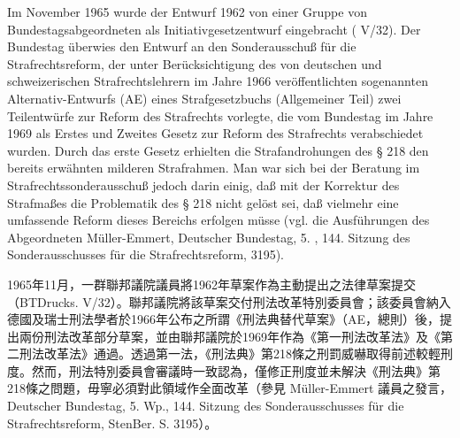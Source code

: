 \documentclass[12pt]{article}
\begin{document}
\syncleft
\begin{sourcepara}
Im November 1965 wurde der Entwurf 1962 von einer Gruppe von Bundestagsabgeordneten als Initiativgesetzentwurf eingebracht (\abbrBTDrucks{} V/32). Der Bundestag überwies den Entwurf an den Sonderausschuß für die Strafrechtsreform, der unter Berücksichtigung des von deutschen und schweizerischen Strafrechtslehrern im Jahre 1966 veröffentlichten sogenannten Alternativ-Entwurfs (AE) eines Strafgesetzbuchs (Allgemeiner Teil) zwei Teilentwürfe zur Reform des Strafrechts vorlegte, die vom Bundestag im Jahre 1969 als Erstes und Zweites Gesetz zur Reform des Strafrechts verabschiedet wurden. Durch das erste Gesetz erhielten die Strafandrohungen des § 218 \abbrStGB{} den bereits erwähnten milderen Strafrahmen. Man war sich bei der Beratung im Strafrechtssonderausschuß jedoch darin einig, daß mit der Korrektur des Strafmaßes die Problematik des § 218 \abbrStGB{} nicht gelöst sei, daß vielmehr eine umfassende Reform dieses Bereichs erfolgen müsse (vgl. die Ausführungen des Abgeordneten \abbrDr{} Müller-Emmert, Deutscher Bundestag, 5. \abbrWp{}, 144. Sitzung des Sonderausschusses für die Strafrechtsreform, \abbrStenBer{} \abbrS{} 3195).
\end{sourcepara}
\begin{transpara}
1965年11月，一群聯邦議院議員將1962年草案作為主動提出之法律草案提交（BTDrucks. V/32）。聯邦議院將該草案交付刑法改革特別委員會；該委員會納入德國及瑞士刑法學者於1966年公布之所謂《刑法典替代草案》（AE，總則）後，提出兩份刑法改革部分草案，並由聯邦議院於1969年作為《第一刑法改革法》及《第二刑法改革法》通過。透過第一法，《刑法典》第218條之刑罰威嚇取得前述較輕刑度。然而，刑法特別委員會審議時一致認為，僅修正刑度並未解決《刑法典》第218條之問題，毋寧必須對此領域作全面改革（參見 Müller-Emmert 議員之發言，Deutscher Bundestag, 5. Wp., 144. Sitzung des Sonderausschusses für die Strafrechtsreform, StenBer. S. 3195）。
\end{transpara}
\end{document}
